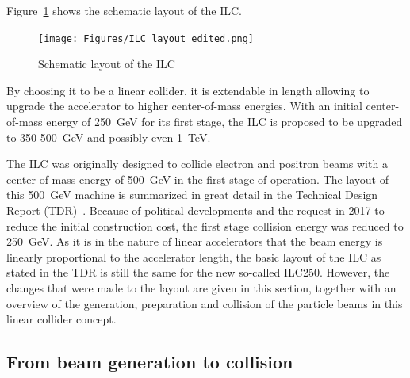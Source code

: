 Figure~\ref{fig:ILC_Layout} shows the schematic layout of the ILC.
\begin{figure}
\centering
\texttt{[image: Figures/ILC\_layout\_edited.png]}
\caption[Schematic layout of the ILC]{Schematic layout of the ILC~\cite[based on p. 9]{TDR1}}
\label{fig:ILC_Layout}
\end{figure}
By choosing it to be a linear collider, it is extendable in length allowing to upgrade the accelerator to higher center-of-mass energies.
With an initial center-of-mass energy of \SI{250}{\GeV} for its first stage, the ILC is proposed to be upgraded to 350-\SI{500}{\GeV} and possibly even \SI{1}{\TeV}.

The ILC was originally designed to collide electron and positron beams with a center-of-mass energy of \SI{500}{\GeV} in the first stage of operation.
The layout of this \SI{500}{\GeV} machine is summarized in great detail in the Technical Design Report (TDR)~\cite{TDR}.
Because of political developments and the request in 2017 to reduce the initial construction cost, the first stage collision energy was reduced to \SI{250}{\GeV}.
As it is in the nature of linear accelerators that the beam energy is linearly proportional to the accelerator length, the basic layout of the ILC as stated in the TDR is still the same for the new so-called ILC250.
However, the changes that were made to the layout are given in this section, together with an overview of the generation, preparation and collision of the particle beams in this linear collider concept.

\subsection{From beam generation to collision}
\label{ILC:layout:details}
